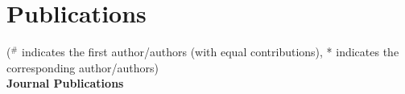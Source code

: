 \documentclass[margin,line]{res}
\begin{document}
\begin{resume}
\begin{itemize}

%

\end{itemize}


\section{\sc Publications}
%
%
($^{\#}$ indicates the first author/authors (with equal contributions), * indicates the corresponding author/authors)\\
\textbf{Journal Publications}


\end{resume}
\end{document}
